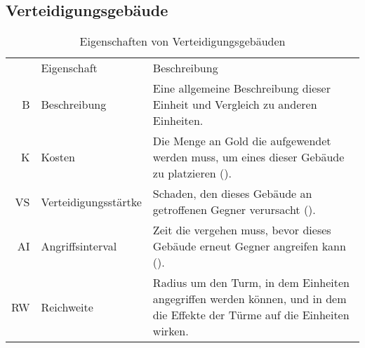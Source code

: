 \subsection{Verteidigungsgebäude}

\begingroup
  \small
  \begin{longtabu}{rlX}
    \rowfont{\normalsize}
    \caption{Eigenschaften von Verteidigungsgebäuden\label{tab:defend-props}}\\

    \midrule[\heavyrulewidth]\rowfont{\itshape}
    & Eigenschaft & Beschreibung \\
    \midrule

    B  & Beschreibung
       & Eine allgemeine Beschreibung dieser Einheit und Vergleich zu anderen
         Einheiten. \\
    K  & Kosten
       & Die Menge an Gold die aufgewendet werden muss, um eines dieser
         Gebäude zu platzieren (). \\
    VS & Verteidigungsstärtke
       & Schaden, den dieses Gebäude an getroffenen Gegner verursacht
         (). \\
    AI & Angriffsinterval
       & Zeit die vergehen muss, bevor dieses Gebäude erneut Gegner angreifen
         kann (). \\
    RW & Reichweite
       & Radius um den Turm, in dem Einheiten angegriffen werden können, und in
         dem die Effekte der Türme auf die Einheiten wirken. \\

    \bottomrule
  \end{longtabu}
\endgroup

